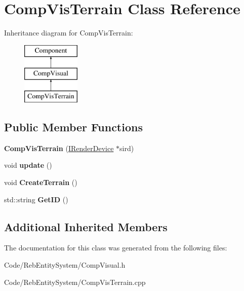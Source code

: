 \hypertarget{class_comp_vis_terrain}{}\section{Comp\+Vis\+Terrain Class Reference}
\label{class_comp_vis_terrain}
Inheritance diagram for Comp\+Vis\+Terrain\+:\begin{figure}[H]
\begin{center}
\leavevmode
\includegraphics[height=3.000000cm]{class_comp_vis_terrain}
\end{center}
\end{figure}
\subsection*{Public Member Functions}
\begin{DoxyCompactItemize}
\item 
{\bfseries Comp\+Vis\+Terrain} (\hyperlink{class_i_render_device}{I\+Render\+Device} $\ast$sird)\hypertarget{class_comp_vis_terrain_a3af611d50cfab9e943cf1d24591e0ad0}{}\label{class_comp_vis_terrain_a3af611d50cfab9e943cf1d24591e0ad0}

\item 
void {\bfseries update} ()\hypertarget{class_comp_vis_terrain_a3ce6d6f6aa7890cf8ed626e24a635c0a}{}\label{class_comp_vis_terrain_a3ce6d6f6aa7890cf8ed626e24a635c0a}

\item 
void {\bfseries Create\+Terrain} ()\hypertarget{class_comp_vis_terrain_a3350c4fa08f262a48d898ecd572f1f05}{}\label{class_comp_vis_terrain_a3350c4fa08f262a48d898ecd572f1f05}

\item 
std\+::string {\bfseries Get\+ID} ()\hypertarget{class_comp_vis_terrain_abed1a415813689541b660966770fc5b2}{}\label{class_comp_vis_terrain_abed1a415813689541b660966770fc5b2}

\end{DoxyCompactItemize}
\subsection*{Additional Inherited Members}


The documentation for this class was generated from the following files\+:\begin{DoxyCompactItemize}
\item 
Code/\+Reb\+Entity\+System/Comp\+Visual.\+h\item 
Code/\+Reb\+Entity\+System/Comp\+Vis\+Terrain.\+cpp\end{DoxyCompactItemize}
